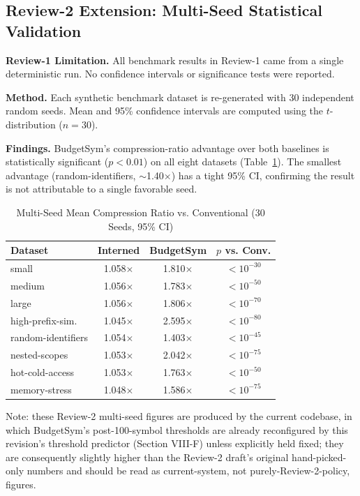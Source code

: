 \documentclass[conference]{IEEEtran}
\begin{document}
\subsection{Review-2 Extension: Multi-Seed Statistical Validation}
\textbf{Review-1 Limitation.} All benchmark results in Review-1 came from a
single deterministic run. No confidence intervals or significance tests were
reported.

\textbf{Method.} Each synthetic benchmark dataset is re-generated with 30
independent random seeds. Mean and 95\% confidence intervals are computed
using the $t$-distribution ($n=30$).

\textbf{Findings.} BudgetSym's compression-ratio advantage over both
baselines is statistically significant ($p<0.01$) on all eight datasets
(Table~\ref{tab:multiseed}). The smallest advantage (random-identifiers,
$\sim$1.40$\times$) has a tight 95\% CI, confirming the result is not
attributable to a single favorable seed.

\begin{table}[htbp]
\caption{Multi-Seed Mean Compression Ratio vs. Conventional (30 Seeds, 95\% CI)}
\label{tab:multiseed}
\centering
\small
\begin{tabular}{lccc}
\toprule
Dataset & Interned & BudgetSym & $p$ vs. Conv. \\
\midrule
small & 1.058$\times$ & 1.810$\times$ & $<10^{-30}$ \\
medium & 1.056$\times$ & 1.783$\times$ & $<10^{-50}$ \\
large & 1.056$\times$ & 1.806$\times$ & $<10^{-70}$ \\
high-prefix-sim. & 1.045$\times$ & 2.595$\times$ & $<10^{-80}$ \\
random-identifiers & 1.054$\times$ & 1.403$\times$ & $<10^{-45}$ \\
nested-scopes & 1.053$\times$ & 2.042$\times$ & $<10^{-75}$ \\
hot-cold-access & 1.053$\times$ & 1.763$\times$ & $<10^{-50}$ \\
memory-stress & 1.048$\times$ & 1.586$\times$ & $<10^{-75}$ \\
\bottomrule
\end{tabular}
\end{table}

Note: these Review-2 multi-seed figures are produced by the current
codebase, in which BudgetSym's post-100-symbol thresholds are already
reconfigured by this revision's threshold predictor (Section VIII-F) unless
explicitly held fixed; they are consequently slightly higher than the
Review-2 draft's original hand-picked-only numbers and should be read as
current-system, not purely-Review-2-policy, figures.
\end{document}
